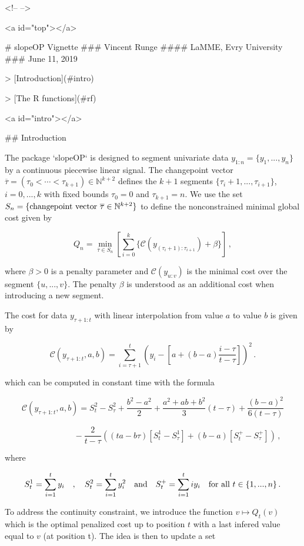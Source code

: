 <!-- 
--> 

<a id="top"></a>

# slopeOP Vignette
### Vincent Runge
#### LaMME, Evry University
### June 11, 2019

> [Introduction](#intro)

> [The R functions](#rf)

<a id="intro"></a>

## Introduction

The package `slopeOP` is designed to segment univariate data $y_{1:n} = \{y_1,...,y_n\}$ by a continuous piecewise linear signal. The changepoint vector $\overline{\tau} = (\tau_0 < \cdots < \tau_{k+1}) \in \mathbb{N}^{k+2}$ defines the $k+1$ segments $\{\tau_i+1,...,\tau_{i+1}\}$, $i = 0,...,k$ with fixed bounds $\tau_0 = 0$ and  $\tau_{k+1} = n$. We use the set $S_n = \{\hbox{changepoint vector } \overline{\tau} \in \mathbb{N}^{k+2}\}$ to define the nonconstrained minimal global cost given by

$$Q_n = \min_{\overline{\tau} \in S_n}\left[ \sum_{i=0}^{k}\lbrace \mathcal{C}(y_{(\tau_i+1):\tau_{i+1}}) + \beta \rbrace \right]\,,$$

where $\beta > 0$ is a penalty parameter and $\mathcal{C}(y_{u:v})$ is the minimal cost over the segment $\{u,...,v\}$. The penalty $\beta$ is understood as an additional cost when introducing a new segment. 

The cost for data $y_{\tau+1:t}$ with linear interpolation from value $a$ to value $b$ is given by

$$
\mathcal{C}(y_{\tau+1:t},a,b) = \sum_{i=\tau+1}^{t}\left(y_i - [a + (b-a)\frac{i-\tau}{t-\tau}]\right)^2\,.
$$

which can be computed in constant time with the formula 

$$\mathcal{C}(y_{\tau+1:t},a,b) = S_{t}^2 - S_{\tau}^2 +\frac{b^2-a^2}{2} + \frac{a^2 + ab +b^2}{3}(t-\tau) + \frac{(b-a)^2}{6(t-\tau)}$$

$$\quad\quad\quad\quad\quad\quad - \frac{2}{t-\tau} \left( (ta-b\tau)[S_{t}^1 - S_{\tau}^1] + (b-a)[S_{t}^+ - S_{\tau}^+]\right)\,,$$

where

$$
S^1_t = \sum_{i=1}^t y_i\quad , \quad S^2_t = \sum_{i=1}^t y_i^2\quad \hbox{and} \quad S^+_t = \sum_{i=1}^t iy_i\quad \hbox{for all} \,\, t \in \{1,...,n\}\,.
$$

To address the continuity constraint, we introduce the function $v \mapsto Q_t(v)$ which is the optimal penalized cost up to position $t$ with a last infered value equal to $v$ (at position t). The idea is then to update a set

